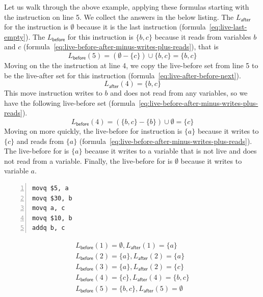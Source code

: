 \documentclass[11pt]{book}
\begin{document}
Let us walk through the above example, applying these formulas
starting with the instruction on line 5. We collect the answers in the
below listing.  The $L_{\mathsf{after}}$ for the 
instruction is $\emptyset$ because it is the last instruction
(formula~\ref{eq:live-last-empty}).  The $L_{\mathsf{before}}$ for
this instruction is $\{b,c\}$ because it reads from variables $b$ and
$c$ (formula~\ref{eq:live-before-after-minus-writes-plus-reads}), that
is
\[
   L_{\mathsf{before}}(5) = (\emptyset - \{c\}) \cup \{ b, c \} = \{ b, c \}
\]
Moving on the the instruction  at line 4, we copy
the live-before set from line 5 to be the live-after set for this
instruction (formula~\ref{eq:live-after-before-next}).
\[
  L_{\mathsf{after}}(4) = \{ b, c \}
\]
This move instruction writes to $b$ and does not read from any
variables, so we have the following live-before set
(formula~\ref{eq:live-before-after-minus-writes-plus-reads}).
\[
  L_{\mathsf{before}}(4) = (\{b,c\} - \{b\}) \cup \emptyset = \{ c \}
\]
Moving on more quickly, the live-before for instruction 
is $\{a\}$ because it writes to $\{c\}$ and reads from $\{a\}$
(formula~\ref{eq:live-before-after-minus-writes-plus-reads}).  The
live-before for  is $\{a\}$ because it writes to a
variable that is not live and does not read from a variable.
Finally, the live-before for  is $\emptyset$
because it writes to variable $a$.
\begin{center}
\begin{minipage}{0.45\textwidth}
\begin{lstlisting}[numbers=left,numberstyle=\tiny]
movq $5, a
movq $30, b
movq a, c
movq $10, b
addq b, c
\end{lstlisting}
\end{minipage}
\vrule\hspace{10pt}
\begin{minipage}{0.45\textwidth}
\begin{align*}
L_{\mathsf{before}}(1)=  \emptyset, 
L_{\mathsf{after}}(1)=  \{a\}\\
L_{\mathsf{before}}(2)=  \{a\},
L_{\mathsf{after}}(2)=  \{a\}\\
L_{\mathsf{before}}(3)=  \{a\},
L_{\mathsf{after}}(2)=  \{c\}\\
L_{\mathsf{before}}(4)=  \{c\},
L_{\mathsf{after}}(4)=  \{b,c\}\\
L_{\mathsf{before}}(5)=  \{b,c\},
L_{\mathsf{after}}(5)=  \emptyset
\end{align*}
\end{minipage}
\end{center}
\end{document}
